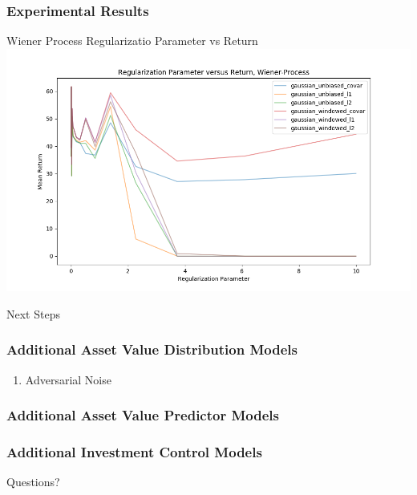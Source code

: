 \documentclass{beamer}
\begin{document}
\begin{frame}
    \frametitle{Experimental Results}

    \begin{block}{Wiener Process Regularizatio Parameter vs Return}
        \includegraphics[width=\linewidth]{gammma_vs_return-Wiener-Process.png}
    \end{block}

\end{frame}



\begin{frame}
    \Huge{\centerline{Next Steps}}
\end{frame}


\begin{frame}
    \frametitle{Additional Asset Value Distribution Models}
    \begin{enumerate}
        \item Adversarial Noise
    \end{enumerate}
\end{frame}

\begin{frame}
    \frametitle{Additional Asset Value Predictor Models}

\end{frame}

\begin{frame}
    \frametitle{Additional Investment Control Models}

\end{frame}

\begin{frame}
    \Huge{\centerline{Questions?}}
\end{frame}

\end{document}
